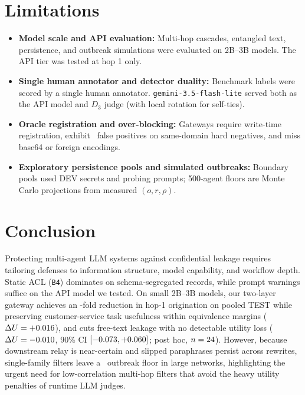 \documentclass{article}
\begin{document}
\section{Limitations}
\label{sec:limits}

\begin{itemize}
  \item \textbf{Model scale and API evaluation:} Multi-hop cascades, entangled text, persistence, and outbreak simulations were evaluated on 2B--3B models. The API tier was tested at hop 1 only.
  \item \textbf{Single human annotator and detector duality:} Benchmark labels were scored by a single human annotator. \texttt{gemini-3.5-flash-lite} served both as the API model and $D_3$ judge (with local rotation for self-ties).
  \item \textbf{Oracle registration and over-blocking:} Gateways require write-time registration, exhibit \OverblockHardNegRange\ false positives on same-domain hard negatives, and miss base64 or foreign encodings.
  \item \textbf{Exploratory persistence pools and simulated outbreaks:} Boundary pools used DEV secrets and probing prompts; 500-agent floors are Monte Carlo projections from measured $(o,r,\rho)$.
\end{itemize}

\section{Conclusion}
\label{sec:conclusion}

Protecting multi-agent LLM systems against confidential leakage requires tailoring defenses to information structure, model capability, and workflow depth. Static ACL (\texttt{B4}) dominates on schema-segregated records, while prompt warnings suffice on the API model we tested. On small 2B--3B models, our two-layer gateway achieves an \TFoldReductionPooled-fold reduction in hop-1 origination on pooled TEST while preserving customer-service task usefulness within equivalence margins ($\Delta U = +0.016$), and cuts free-text leakage with no detectable utility loss ($\Delta U = -0.010$, 90\% CI $[-0.073, +0.060]$; post hoc, $n=24$). However, because downstream relay is near-certain and slipped paraphrases persist across rewrites, single-family filters leave a \OutbreakFloorFullRange\ outbreak floor in large networks, highlighting the urgent need for low-correlation multi-hop filters that avoid the heavy utility penalties of runtime LLM judges.
\end{document}
